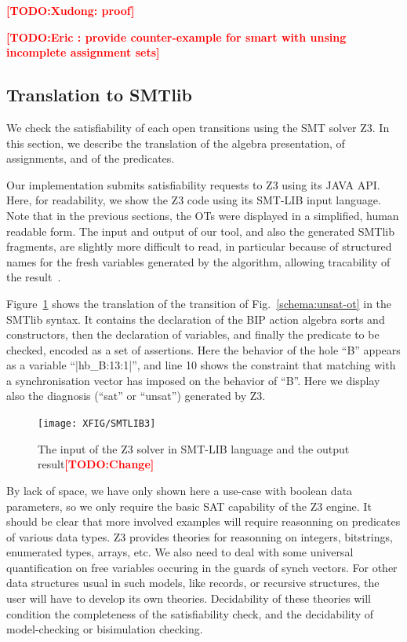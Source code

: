 \documentclass[smallcondensed]{svjour3}
\newcommand{\TODO}[1]{\textcolor{red}{\textbf{[TODO:#1]}}}
\begin{document}
\TODO{Xudong: proof}

\TODO{Eric : provide counter-example for smart with unsing incomplete
  assignment sets}


\subsection{Translation to SMTlib}

We check the satisfiability of each open transitions
using the SMT solver Z3.
In this
section, we describe the translation of the algebra presentation, of
assignments, and of the predicates.

Our implementation submits satisfiability requests to
Z3 using its JAVA API. Here, for readability, we
show the Z3 code using its SMT-LIB input language.
Note that in the previous sections, the OTs were displayed in a
  simplified, human readable form. The input and output of our tool, and
  also the generated SMTlib fragments, are
  slightly more difficult to read, in 
particular because of structured names for the fresh variables generated
by the algorithm, allowing tracability of the result~\cite{Avocs-RR}.

Figure~\ref{schema:smt-lib} shows the translation of the
transition of Fig.~\ref{schema:unsat-ot}
in the SMTlib syntax.
It contains the declaration
of the BIP action algebra sorts 
and constructors, then the declaration of variables, and finally the
predicate to be checked, encoded as a set of assertions.
Here the behavior of the hole ``B'' appears as a variable
``|hb\_B:13:1|'', and line 10 shows the constraint that matching with
a synchronisation vector has imposed on the behavior of ``B''.
Here we display also the diagnosis (``sat'' or ``unsat'') generated by Z3.

\begin{figure}[t]
    \centerline{\texttt{[image: XFIG/SMTLIB3]}}
  \caption{The input of the Z3 solver in SMT-LIB language and the output result\TODO{Change}}  \label{schema:smt-lib}
\end{figure}

By lack of space, we have only shown here a use-case with boolean data
parameters, so we only require the basic SAT capability of the Z3
engine. It should be clear that more involved examples will require
reasonning on predicates of various data types. Z3 provides theories for reasonning
on integers, bitstrings, enumerated types, arrays, etc.
We also need to deal with some universal quantification on free
variables occuring in the guards of synch vectors.
For other data structures usual in such models, like records, or
recursive structures, the user will have to develop its own theories.
Decidability of these theories will condition the completeness of the
satisfiability check, and the decidability of model-checking or
bisimulation checking.
\end{document}
